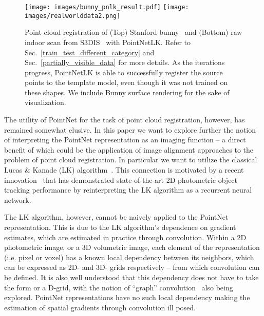 \documentclass[10pt,twocolumn,letterpaper]{article}
\begin{document}
\begin{figure}[h!]
\centering
\texttt{[image: images/bunny\_pnlk\_result.pdf]}
\texttt{[image: images/realworlddata2.png]}
\caption{Point cloud registration of (Top) Stanford bunny~\cite{turk2005stanford} and (Bottom) raw indoor scan from S3DIS~\cite{Armeni_2016_CVPR} with PointNetLK. Refer to Sec.~\ref{train_test_different_category} and  Sec.~\ref{partially_visible_data} for more details. As the iterations progress, PointNetLK is able to successfully register the source points to the template model, even though it was not trained on these shapes. We include Bunny surface rendering for the sake of visualization.}
\label{fig_bunny}
\end{figure}

The utility of PointNet for the task of point cloud registration, however, has remained somewhat elusive. In this paper we want to explore further the notion of interpreting the PointNet representation as an imaging function -- a direct benefit of which could be the application of image alignment approaches to the problem of point cloud registration. In particular we want to utilize the classical Lucas \& Kanade (LK) algorithm~\cite{lucas1981iterative}. This connection is motivated by a recent innovation~\cite{wang2018deep} that has demonstrated state-of-the-art 2D photometric object tracking performance by reinterpreting the LK algorithm as a recurrent neural network. 


The LK algorithm, however, cannot be naively applied to the PointNet representation. This is due to the LK algorithm's dependence on gradient estimates, which are estimated in practice through convolution. Within a 2D photometric image, or a 3D volumetric image, each element of the representation (i.e. pixel or voxel) has a known local dependency between its neighbors, which can be expressed as 2D- and 3D- grids respectively -- from which convolution can be defined. It is also well understood that this dependency does not have to take the form or a D-grid, with the notion of ``graph'' convolution~\cite{wang2018dynamic} also being explored. PointNet representations have no such local dependency making the estimation of spatial gradients through convolution ill posed. 
\end{document}
